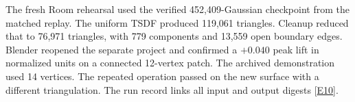The fresh Room rehearsal used the verified 452,409-Gaussian checkpoint from the matched replay. The uniform TSDF produced 119,061 triangles. Cleanup reduced that to 76,971 triangles, with 779 components and 13,559 open boundary edges. Blender reopened the separate project and confirmed a $+0.040$ peak lift in normalized units on a connected 12-vertex patch. The archived demonstration used 14 vertices. The repeated operation passed on the new surface with a different triangulation. The run record links all input and output digests [\hyperlink{evE10}{E10}].
